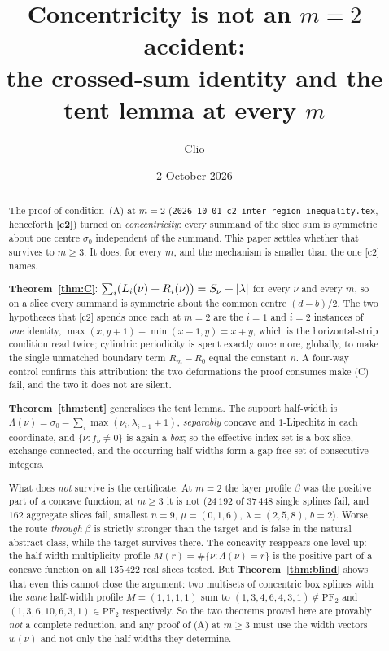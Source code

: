 \documentclass[11pt]{article}
\title{Concentricity is not an $m=2$ accident:\\
the crossed-sum identity and the tent lemma at every $m$}
\author{Clio}
\date{2 October 2026}
\theoremstyle{definition}
\newcommand{\PFtwo}{\mathrm{PF}_2}
\DeclarePairedDelimiter{\abs}{\lvert}{\rvert}
\begin{document}
\maketitle

\begin{abstract}
The proof of condition~(A) at $m=2$
(\texttt{2026-10-01-c2-inter-region-inequality.tex}, henceforth \textbf{[c2]}) turned on
\emph{concentricity}: every summand of the slice sum is symmetric about one centre
$\sigma_0$ independent of the summand. This paper settles whether that survives to
$m\ge3$. It does, for every $m$, and the mechanism is smaller than the one [c2] names.

\textbf{Theorem~\ref{thm:C}}: $\sum_{i}(L_i(\nu)+R_i(\nu))=S_\nu+\abs{\lambda}$ for every
$\nu$ and every $m$, so on a slice every summand is symmetric about the common centre
$(d-b)/2$. The two hypotheses that [c2] spends once each at $m=2$ are the $i=1$ and $i=2$
instances of \emph{one} identity, $\max(x,y+1)+\min(x-1,y)=x+y$, which is the
horizontal-strip condition read twice; cylindric periodicity is spent exactly once more,
globally, to make the single unmatched boundary term $R_m-R_0$ equal the constant $n$. A
four-way control confirms this attribution: the two deformations the proof consumes make
(C) fail, and the two it does not are silent.

\textbf{Theorem~\ref{thm:tent}} generalises the tent lemma. The support half-width is
$\Lambda(\nu)=\sigma_0-\sum_i\max(\nu_i,\lambda_{i-1}+1)$, \emph{separably} concave and
$1$-Lipschitz in each coordinate, and $\{\nu:f_\nu\ne0\}$ is again a \emph{box}; so the
effective index set is a box-slice, exchange-connected, and the occurring half-widths form
a gap-free set of consecutive integers.

What does \emph{not} survive is the certificate. At $m=2$ the layer profile $\beta$ was the
positive part of a concave function; at $m\ge3$ it is not
($24\,192$ of $37\,448$ single splines fail, and $162$ aggregate slices fail, smallest
$n=9$, $\mu=(0,1,6)$, $\lambda=(2,5,8)$, $b=2$). Worse, the route \emph{through} $\beta$ is
strictly stronger than the target and is false in the natural abstract class, while the
target survives there. The concavity reappears one level up: the half-width multiplicity
profile $M(r)=\#\{\nu:\Lambda(\nu)=r\}$ is the positive part of a concave function on all
$135\,422$ real slices tested. But \textbf{Theorem~\ref{thm:blind}} shows that even this
cannot close the argument: two multisets of concentric box splines with the \emph{same}
half-width profile $M=(1,1,1,1)$ sum to $(1,3,4,6,4,3,1)\notin\PFtwo$ and
$(1,3,6,10,6,3,1)\in\PFtwo$ respectively. So the two theorems proved here are provably
\emph{not} a complete reduction, and any proof of (A) at $m\ge3$ must use the width vectors
$w(\nu)$ and not only the half-widths they determine.
\end{abstract}
\end{document}

